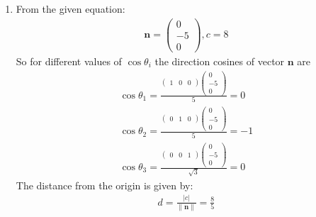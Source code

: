 \documentclass[12pt]{article}
\providecommand{\norm}[1]{\left\lVert#1\right\rVert}
\newcommand{\myvec}[1]{\ensuremath{\begin{pmatrix}#1\end{pmatrix}}}
\let\vec\mathbf
\begin{document}
\begin{enumerate}
\item From the given equation:
         \begin{align}
		\vec{n}=\myvec{0\\-5\\0},c=8
			\end{align}
	So for different values of $\cos\theta_i$ the direction cosines of vector $\vec{n}$ are
		\begin{align}
		\cos\theta_1=\frac{\myvec{1&0&0}\myvec{0 \\ -5\\0}}{5}=0\\
			\cos\theta_2=\frac{\myvec{0&1&0}\myvec{0 \\ -5\\0}}{5}=-1\\
			\cos\theta_3=\frac{\myvec{0&0&1}\myvec{0\\-5\\0}}{\sqrt{3}}=0
		\end{align}
	The distance from the origin is given by:
		\begin{align}
			d=\frac{|c|}{\norm{\vec{n}}}=\frac{8}{5}
		\end{align}

\end{enumerate}
\end{document}
